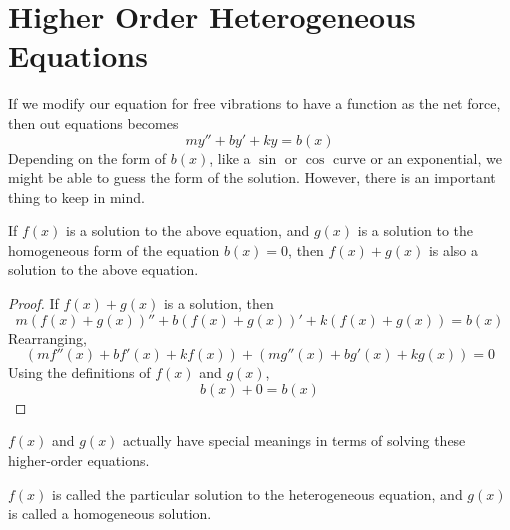 \section{Higher Order Heterogeneous Equations}
\noindent
If we modify our equation for free vibrations to have a function as the net force, then out equations becomes
\begin{equation*}
	my'' + by' + ky = b(x)
\end{equation*}
Depending on the form of $b(x)$, like a $\sin$ or $\cos$ curve or an exponential, we might be able to guess the form of the solution. However, there is an important thing to keep in mind.

\begin{theorem}
	If $f(x)$ is a solution to the above equation, and $g(x)$ is a solution to the homogeneous form of the equation $b(x) = 0$, then $f(x) + g(x)$ is also a solution to the above equation.
\end{theorem}
\begin{proof}
	If $f(x) + g(x)$ is a solution, then
	\begin{equation*}
		m\left(f(x) + g(x)\right)'' + b\left(f(x) + g(x)\right)' + k\left(f(x) + g(x)\right) = b(x)
	\end{equation*}
	Rearranging,
	\begin{equation*}
		\left(mf''(x) + bf'(x) + kf(x)\right) + \left(mg''(x) + bg'(x) + kg(x)\right) = 0
	\end{equation*}
	Using the definitions of $f(x)$ and $g(x)$,
	\begin{equation*}
		b(x) + 0 = b(x)
	\end{equation*}
\end{proof}

\noindent
$f(x)$ and $g(x)$ actually have special meanings in terms of solving these higher-order equations.
\begin{definition}
	$f(x)$ is called the particular solution to the heterogeneous equation, and $g(x)$ is called a homogeneous solution.
\end{definition}


